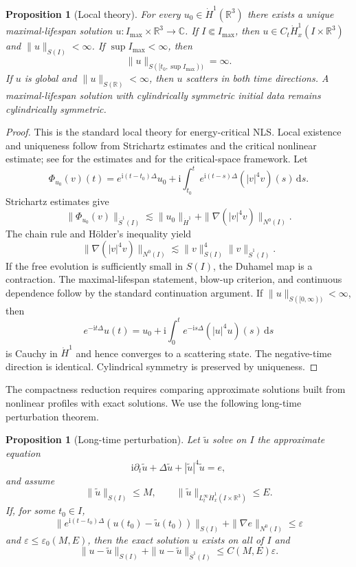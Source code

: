 \documentclass[preprint,12pt]{elsarticle}
\numberwithin{equation}{section}
\newcommand{\R}{\mathbb R}
\newcommand{\C}{\mathbb C}
\newcommand{\ii}{\mathrm i}
\newcommand{\dd}{\,\mathrm d}
\newcommand{\eps}{\varepsilon}
\newcommand{\na}{\nabla}
\newcommand{\pa}{\partial}
\newtheorem{proposition}[theorem]{Proposition}
\theoremstyle{remark}
\begin{document}
\begin{proposition}[Local theory]\label{prop:LWP}
For every $u_0\in\dot H^1(\R^3)$ there exists a unique maximal-lifespan solution $u:I_{\max}\times\R^3\to\C$.  If $I\Subset I_{\max}$, then $u\in C_t\dot H^1_x(I\times\R^3)$ and $\|u\|_{S(I)}<\infty$.  If $\sup I_{\max}<\infty$, then
\[
  \|u\|_{S([t_0,\sup I_{\max}))}=\infty.
\]
If $u$ is global and $\|u\|_{S(\R)}<\infty$, then $u$ scatters in both time directions.  A maximal-lifespan solution with cylindrically symmetric initial data remains cylindrically symmetric.
\end{proposition}

\begin{proof}
This is the standard local theory for energy-critical NLS.  Local existence and uniqueness follow from Strichartz estimates and the critical nonlinear estimate; see \cite{Strichartz1977,KeelTao1998} for the estimates and \cite{CazenaveWeissler1990,Cazenave2003,Tao2006} for the critical-space framework.  Let
\[
  \Phi_{u_0}(v)(t)=e^{\ii(t-t_0)\Delta}u_0+
  \ii\int_{t_0}^t e^{\ii(t-s)\Delta}(|v|^4v)(s)\dd s.
\]
Strichartz estimates give
\[
  \|\Phi_{u_0}(v)\|_{\dot S^1(I)}
  \lesssim \|u_0\|_{\dot H^1}+
  \|\na(|v|^4v)\|_{N^0(I)}.
\]
The chain rule and H\"older's inequality yield
\[
  \|\na(|v|^4v)\|_{N^0(I)}
  \lesssim \|v\|_{S(I)}^4\|v\|_{\dot S^1(I)}.
\]
If the free evolution is sufficiently small in $S(I)$, the Duhamel map is a contraction.  The maximal-lifespan statement, blow-up criterion, and continuous dependence follow by the standard continuation argument.  If $\|u\|_{S([0,\infty))}<\infty$, then
\[
  e^{-\ii t\Delta}u(t)=u_0+
  \ii\int_0^t e^{-\ii s\Delta}(|u|^4u)(s)\dd s
\]
is Cauchy in $\dot H^1$ and hence converges to a scattering state.  The negative-time direction is identical.  Cylindrical symmetry is preserved by uniqueness.
\end{proof}

The compactness reduction requires comparing approximate solutions built from nonlinear profiles with exact solutions.  We use the following long-time perturbation theorem.

\begin{proposition}[Long-time perturbation]\label{prop:stability}
Let $\widetilde u$ solve on $I$ the approximate equation
\[
  \ii\pa_t\widetilde u+\Delta\widetilde u+|\widetilde u|^4\widetilde u=e,
\]
and assume
\[
  \|\widetilde u\|_{S(I)}\le M,
  \qquad \|\widetilde u\|_{L_t^\infty\dot H_x^1(I\times\R^3)}\le E.
\]
If, for some $t_0\in I$,
\[
  \|e^{\ii(t-t_0)\Delta}(u(t_0)-\widetilde u(t_0))\|_{S(I)}
  +\|\na e\|_{N^0(I)}\le\eps
\]
and $\eps\le\eps_0(M,E)$, then the exact solution $u$ exists on all of $I$ and
\begin{equation}\label{eq:stability-conclusion}
  \|u-\widetilde u\|_{S(I)}+\|u-\widetilde u\|_{\dot S^1(I)}
  \le C(M,E)\eps.
\end{equation}
\end{proposition}
\end{document}
